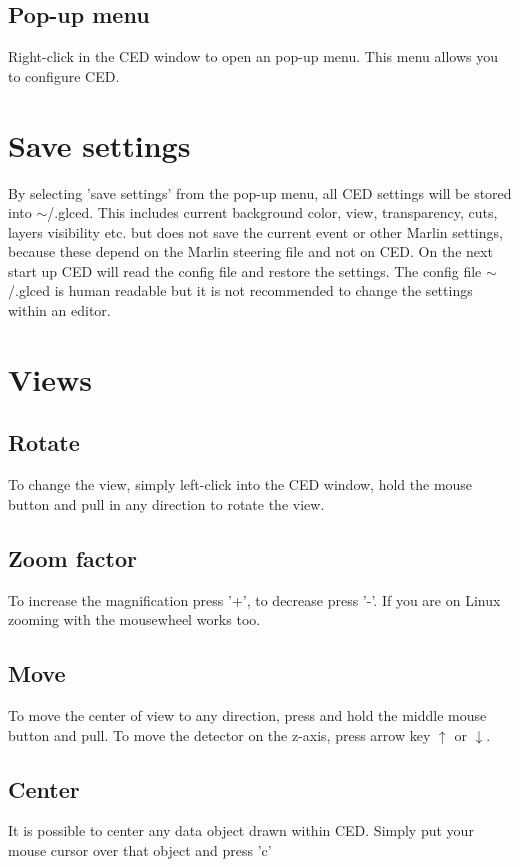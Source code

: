 \documentclass[a4paper,10pt]{article}
\begin{document}
\subsection{Pop-up menu}
Right-click in the CED window to open an pop-up menu. This menu allows you to configure CED.

\section{Save settings}
By selecting 'save settings' from the pop-up menu, all CED settings will be stored into $\sim$/.glced. This includes current background color, view, transparency, cuts, layers visibility etc. but does not save the current event or other Marlin settings, because these depend on the Marlin steering file and not on CED. On the next start up CED will read the config file and restore the settings.
\newline\newline
The config file $\sim$/.glced is human readable but it is not recommended to change the settings within an editor.

\section{Views}
\subsection{Rotate}
To change the view, simply left-click into the CED window, hold the mouse button and pull in any direction to rotate the view.
\subsection{Zoom factor}
To increase the magnification press '+', to decrease press '-'. If you are on Linux zooming with the mousewheel works too. 

\subsection{Move}
To move the center of view to any direction, press and hold the middle mouse button and pull. 
\newline\newline
To move the detector on the z-axis, press arrow key $\uparrow$ or $\downarrow$. 

\subsection{Center}
It is possible to center any data object drawn within CED. Simply put your mouse cursor over that object and press 'c' 
\end{document}
